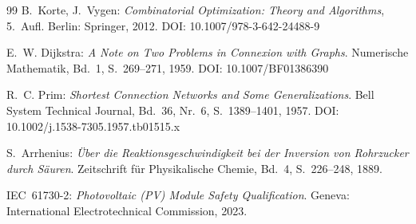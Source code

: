 ﻿\documentclass[a4paper,12pt]{article}
\theoremstyle{definition}
\theoremstyle{remark}
\begin{document}
\begin{thebibliography}{99}
B.~Korte, J.~Vygen:
\textit{Combinatorial Optimization: Theory and Algorithms}, 5.~Aufl.
Berlin: Springer, 2012.
DOI: 10.1007/978-3-642-24488-9

E.~W. Dijkstra:
\textit{A Note on Two Problems in Connexion with Graphs}.
Numerische Mathematik, Bd.~1, S.~269--271, 1959.
DOI: 10.1007/BF01386390

R.~C. Prim:
\textit{Shortest Connection Networks and Some Generalizations}.
Bell System Technical Journal, Bd.~36, Nr.~6, S.~1389--1401, 1957.
DOI: 10.1002/j.1538-7305.1957.tb01515.x

S.~Arrhenius:
\textit{Über die Reaktionsgeschwindigkeit bei der Inversion von Rohrzucker
durch Säuren}.
Zeitschrift für Physikalische Chemie, Bd.~4, S.~226--248, 1889.

IEC~61730-2:
\textit{Photovoltaic (PV) Module Safety Qualification}.
Geneva: International Electrotechnical Commission, 2023.

\end{thebibliography}
\end{document}
